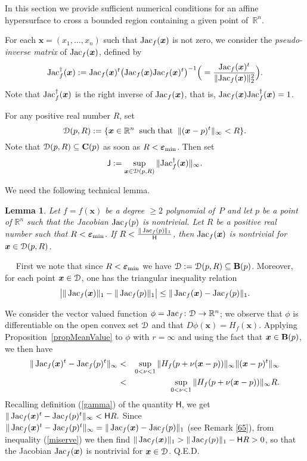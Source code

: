\documentclass[10pt]{article}
\newcommand\qed{{\hspace*{\fill}Q.E.D.\vskip12pt plus 1pt}}
\newcommand\sD{{\cal D}}
\newcommand{\x}{{\bm x}}
\newcommand\proof{\noindent{\em Proof.}\ \ } \newcommand\mult{\mbox{\rm mult}}
\newcommand\R{{\mathbb R}}
\newcommand{\epsbold}{{\bm \varepsilon}}
\def\Jac{\mathop{\rm Jac}\nolimits}
\newtheorem{lemma}[theorem]{Lemma}
\begin{document}
In this section we provide sufficient  numerical conditions 
for  an  affine hypersurface to cross  a bounded region containing 
a given point  of~$\R^n$. 

 For each $\x=(x_1,\ldots,x_n)$ such that ${\rm Jac}_f(\x)$ is not zero, we consider the  {\em pseudo-inverse matrix} of ${\rm Jac}_f(\x)$, defined by
$$
{\rm Jac}_f^\dagger(\x):={\rm Jac}_f(\x)^t\big({\rm Jac}_f(\x) {\rm Jac}_f(\x)^t\big)^{-1} \Big(=\frac{{\rm Jac}_f(\x)^t}{\|{\rm Jac}_f(\x)\|_2^2}\Big).$$ 
Note  that ${\rm Jac}_f^\dagger(\x)$ is the right inverse of $ {\rm Jac}_f(\x)$, that is, 
${\rm Jac}_f(\x){\rm Jac}_f^\dagger(\x)=1$.

For any    positive real number $R$,  set
$$
\mathcal D(p, R):=\{\x \in \R^n \;\;{\rm such\; that}\; \; \|(\x -p)^t \|_\infty < R\}.
$$ 
Note that  $\mathcal D(p, R)\subseteq \mathcal {\bf C}(p)$ as soon as $R< \epsbold_{\rm min}$. 
Then set
\begin{equation}\label{mu}
\mathsf J: = \sup_{\x \in \mathcal D(p, R)} \|{\rm Jac}_f^\dagger(\x)\|_\infty.
\end{equation}

We need the following technical lemma.

\begin{lemma}\label{Full1} 
Let $f=f(\x)$ be a degree $\geq 2$ polynomial of~$P$ and 
let $p$ be a point of $\R^n$ such  that the Jacobian  $\Jac_f(p)$ is nontrivial.
Let $R$ be a positive real number such that $R < \epsbold_{{\rm min}}$.
If $ R<\frac{\|\Jac_f(p)\|_1}{\mathsf H}$, 
 then ${\rm Jac}_f(\x)$ is   nontrivial for  $\x\in  \sD(p,R)$. 
\end{lemma}
\proof
First we note that since $R < \epsbold_{\rm min}$ we have $\sD:=\sD(p,R) \subseteq {\bf B}(p)$.
Moreover, for each point $\x \in \sD$, one has  the triangular inequality  relation
\begin{equation}\label{miserve}
\big| \|\Jac_f(\x)\|_1 - \|\Jac_f(p)\|_1 \big| \le \|\Jac_f(\x) - \Jac_f(p)\|_1.
\end{equation}
 
 We consider the vector valued function $\phi = \Jac_f\colon \sD \rightarrow \R^n$;
we observe that $\phi$ is differentiable on the open convex set $\sD$
and that $D \phi(\x) = H_f(\x)$. Applying Proposition~\ref{propMeanValue} 
to $\phi$ with $r =\infty$ and using the fact that $\x \in {\bf B}(p)$, we then have
\begin{eqnarray}\label{depressione}
\|\Jac_f(\x)^t - \Jac_f(p)^t\|_\infty &<& \sup_{0<\nu<1} \|H_f(p+\nu(\x-p))\|_\infty \|(\x-p)^t\|_\infty 
\nonumber\\
&<& \sup_{0<\nu<1} \|H_f(p+\nu(\x-p))\|_\infty R.
\end{eqnarray}
Recalling  definition (\ref{gamma}) of the quantity $\mathsf H$, we get
$
\|\Jac_f(\x)^t - \Jac_f(p)^t\|_\infty < \mathsf H R.
$
Since $\|\Jac_f(\x)^t - \Jac_f(p)^t\|_\infty = \|\Jac_f(\x) - \Jac_f(p)\|_1$ (see Remark \ref{65}),
from inequality (\ref{miserve}) we then find  
$\|\Jac_f(\x)\|_1 > \|\Jac_f(p)\|_1 - {\mathsf H} R >0$, 
so that  the Jacobian  $\Jac_f(\bm x)$ is nontrivial  for $\x\in \sD$.
\qed
\end{document}
